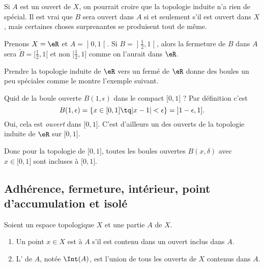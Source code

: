 Si \( A\) est un ouvert de \( X\), on pourrait croire que la topologie induite n'a rien de spécial. Il est vrai que \( B\) sera ouvert dans \( A\) si et seulement s'il est ouvert dans \( X\), mais certaines choses surprenantes se produisent tout de même.

\begin{example} \label{ExloeyoR}
Prenons \( X=\eR\) et \( A=\mathopen] 0 , 1 \mathclose[\). Si \( B=\mathopen] \frac{ 1 }{2} , 1 \mathclose[ \), alors la fermeture de \( B\) dans \( A\) sera \( \tilde B=\mathopen[ \frac{ 1 }{2} , 1 [\) et non \( \mathopen[ \frac{ 1 }{2} , 1 \mathclose]\) comme on l'aurait dans \( \eR\).
\end{example}

Prendre la topologie induite de \( \eR\) vers un fermé de \( \eR\) donne des boules un peu spéciales comme le montre l'exemple suivant.

\begin{example}  \label{ExKYZwYxn}
    Quid de la boule ouverte \( B(1,\epsilon)\) dans le compact \( \mathopen[ 0 , 1 \mathclose]\) ? Par définition c'est
    \begin{equation}
        B(1,\epsilon)=\{ x\in\mathopen[ 0 , 1 \mathclose]\tq | x-1 |<\epsilon \}=\mathopen] 1-\epsilon , 1 \mathclose].
    \end{equation}
    Oui, cela est \emph{ouvert} dans \( \mathopen[ 0 , 1 \mathclose]\). C'est d'ailleurs un des ouverts de la topologie induite de \( \eR\) sur \( \mathopen[ 0 , 1 \mathclose]\).

    Donc pour la topologie de \( \mathopen[ 0 , 1 \mathclose]\), toutes les boules ouvertes \( B(x,\delta)\) avec \( x\in\mathopen[ 0 , 1 \mathclose]\) sont incluses à \( \mathopen[ 0 , 1 \mathclose]\).
\end{example}


\subsection{Adhérence, fermeture, intérieur, point d'accumulation et isolé}

\begin{definition}      \label{DEFooSVWMooLpAVZRInt}
    Soient un espace topologique \( X\) et une partie \( A\) de \( X\).
    \begin{enumerate}
        \item
            Un point \( x\in X\) est  à \( A\) s'il est contenu dans un ouvert inclus dans \( A\).
        \item
            L' de \( A\), notée \( \Int(A)\), est l'union de tous les ouverts de \( X\) contenus dans \( A\).
    \end{enumerate}
\end{definition}


